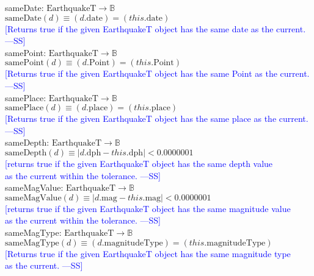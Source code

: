 \documentclass[12pt]{article}
\newcommand{\authornote}[3]{\textcolor{#1}{[#3 ---#2]}}
\newcommand{\authornote}[3]{}
\newcommand{\wss}[1]{\authornote{blue}{SS}{#1}}
\begin{document}
\noindent sameDate: $\mbox{EarthquakeT} \rightarrow \mathbb{B}$\\
$\mbox{sameDate}(d) \equiv (d.\mbox{date}) = (this.\mbox{date})$\\
\noindent \wss{Returns true if the given EarthquakeT object has the same date as the current.}\\

\noindent samePoint: $\mbox{EarthquakeT} \rightarrow \mathbb{B}$\\
$\mbox{samePoint}(d) \equiv (d.\mbox{Point}) = (this.\mbox{Point})$\\
\noindent \wss{Returns true if the given EarthquakeT object has the same Point as the current.}\\

\noindent samePlace: $\mbox{EarthquakeT} \rightarrow \mathbb{B}$\\
$\mbox{samePlace}(d) \equiv (d.\mbox{place}) = (this.\mbox{place})$\\
\noindent \wss{Returns true if the given EarthquakeT object has the same place as the current.}\\

\noindent sameDepth: $\mbox{EarthquakeT} \rightarrow \mathbb{B}$\\
$\mbox{sameDepth}(d) \equiv |d.\mbox{dph} - this.\mbox{dph}| < 0.0000001$\\
\noindent \wss{returns true if the given EarthquakeT object has the same depth value\\
 as the current within the tolerance.}\\

\noindent sameMagValue: $\mbox{EarthquakeT} \rightarrow \mathbb{B}$\\
$\mbox{sameMagValue}(d) \equiv |d.\mbox{mag} - this.\mbox{mag}| < 0.0000001$\\
\noindent \wss{returns true if the given EarthquakeT object has the same magnitude value\\
 as the current within the tolerance.}\\

\noindent sameMagType: $\mbox{EarthquakeT} \rightarrow \mathbb{B}$\\
$\mbox{sameMagType}(d) \equiv (d.\mbox{magnitudeType}) = (this.\mbox{magnitudeType})$\\
\noindent \wss{Returns true if the given EarthquakeT object has the same magnitude type\\
 as the current.}\\
\end{document}
